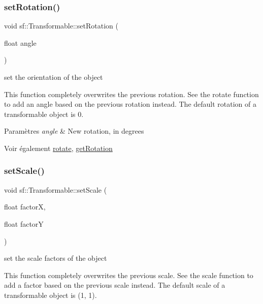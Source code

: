 \subsubsection{\texorpdfstring{set\+Rotation()}{setRotation()}}
{\footnotesize\ttfamily void sf\+::\+Transformable\+::set\+Rotation (\begin{DoxyParamCaption}\item[{float}]{angle }\end{DoxyParamCaption})}



set the orientation of the object 

This function completely overwrites the previous rotation. See the rotate function to add an angle based on the previous rotation instead. The default rotation of a transformable object is 0.


\begin{DoxyParams}{Paramètres}
{\em angle} & New rotation, in degrees\\
\hline
\end{DoxyParams}
\begin{DoxySeeAlso}{Voir également}
\hyperlink{classsf_1_1Transformable_af8a5ffddc0d93f238fee3bf8efe1ebda}{rotate}, \hyperlink{classsf_1_1Transformable_aa00b5c5d4a06ac24a94dd72c56931d3a}{get\+Rotation} 
\end{DoxySeeAlso}
\mbox{\label{classsf_1_1Transformable_aaec50b46b3f41b054763304d1e727471}} 
\subsubsection{\texorpdfstring{set\+Scale()}{setScale()}\hspace{0.1cm}{\footnotesize\ttfamily [1/2]}}
{\footnotesize\ttfamily void sf\+::\+Transformable\+::set\+Scale (\begin{DoxyParamCaption}\item[{float}]{factorX,  }\item[{float}]{factorY }\end{DoxyParamCaption})}



set the scale factors of the object 

This function completely overwrites the previous scale. See the scale function to add a factor based on the previous scale instead. The default scale of a transformable object is (1, 1).


